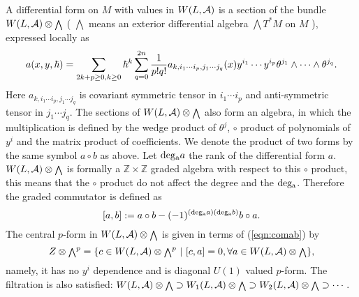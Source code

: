 \documentclass[10pt,a4paper]{article}
\def\h{\hbar}
\begin{document}
A differential form on $M$ with values in $W(L,{\cal A})$ is a section of the bundle $W(L,{\cal A})\otimes{\scriptstyle \bigwedge}$ ( ${\scriptstyle \bigwedge}$ means an exterior differential algebra ${\scriptstyle \bigwedge} T^{*}M$ on $M$ ), expressed locally as
\begin{equation}
\label{eqn:aexp}
a(x,y,\h)=\sum_{2k+p\geq0,k\geq0}\h^k \sum_{q=0}^{2n}{1\over p!q!}a_{k,i_1\cdots i_p,j_1\cdots j_q}(x)y^{i_1}\cdots y^{i_p}\theta^{j_1}\wedge\cdots\wedge\theta^{j_q}.
\end{equation}
Here $a_{k,i_1\cdots i_p,j_1\cdots j_q}$ is covariant symmetric tensor in $i_1\cdots i_p$ and anti-symmetric tensor in $j_1\cdots j_q$. The sections of $W(L,{\cal A})\otimes{\scriptstyle \bigwedge}$ also form an algebra, in which the multiplication is defined by the wedge product of $\theta^j$, $\circ$ product of polynomials of $y^i$ and the matrix product of coefficients. We denote the product of two forms by the same symbol $a\circ b$ as above. Let ${\rm deg_a}a$ the rank of the differential form $a$. $W(L,{\cal A})\otimes{\scriptstyle \bigwedge}$ is formally a ${\mathbb Z}\times{\mathbb Z}$ graded algebra with respect to this $\circ$ product, this means that the $\circ$ product do not affect the degree and the ${\rm deg_a}$. Therefore the graded commutator is defined as
\begin{equation}
\label{eqn:comab}
[a,b]:=a\circ b-(-1)^{({\rm deg_a}a)({\rm deg_a}b)}b\circ a.
\end{equation}
The central $p$-form in $W(L,{\cal A})\otimes{\scriptstyle \bigwedge}$ is given in terms of (\ref{eqn:comab}) by
\begin{equation}
Z\otimes {\scriptstyle \bigwedge}^p=\{c\in W(L,{\cal A})\otimes {\scriptstyle \bigwedge}^p\ |\ [c,a]=0,\forall a\in W(L,{\cal A})\otimes {\scriptstyle \bigwedge}\},
\end{equation}
namely, it has no $y^i$ dependence and is diagonal $U(1)$ valued $p$-form.
The filtration is also satisfied: $W(L,{\cal A})\otimes{\scriptstyle \bigwedge}\supset W_1(L,{\cal A})\otimes{\scriptstyle \bigwedge}\supset W_2(L,{\cal A})\otimes{\scriptstyle \bigwedge}\supset\cdots$.\\
\end{document}
